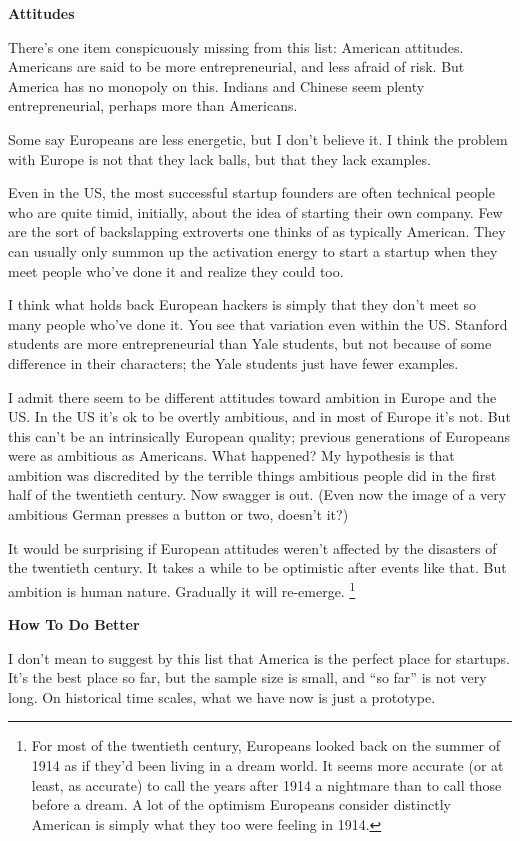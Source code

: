 \textbf{Attitudes}

There's one item conspicuously missing from this list: American
attitudes. Americans are said to be more entrepreneurial, and less
afraid of risk. But America has no monopoly on this. Indians and Chinese
seem plenty entrepreneurial, perhaps more than Americans.

Some say Europeans are less energetic, but I don't believe it. I think
the problem with Europe is not that they lack balls, but that they lack
examples.

Even in the US, the most successful startup founders are often technical
people who are quite timid, initially, about the idea of starting their
own company. Few are the sort of backslapping extroverts one thinks of
as typically American. They can usually only summon up the activation
energy to start a startup when they meet people who've done it and
realize they could too.

I think what holds back European hackers is simply that they don't meet
so many people who've done it. You see that variation even within the
US. Stanford students are more entrepreneurial than Yale students, but
not because of some difference in their characters; the Yale students
just have fewer examples.

I admit there seem to be different attitudes toward ambition in Europe
and the US. In the US it's ok to be overtly ambitious, and in most of
Europe it's not. But this can't be an intrinsically European quality;
previous generations of Europeans were as ambitious as Americans. What
happened? My hypothesis is that ambition was discredited by the terrible
things ambitious people did in the first half of the twentieth century.
Now swagger is out. (Even now the image of a very ambitious German
presses a button or two, doesn't it?)

It would be surprising if European attitudes weren't affected by the
disasters of the twentieth century. It takes a while to be optimistic
after events like that. But ambition is human nature. Gradually it will
re-emerge. \footnote{For most of the twentieth century, Europeans looked back on the
summer of 1914 as if they'd been living in a dream world. It seems more
accurate (or at least, as accurate) to call the years after 1914 a
nightmare than to call those before a dream. A lot of the optimism
Europeans consider distinctly American is simply what they too were
feeling in 1914.}

\textbf{How To Do Better}

I don't mean to suggest by this list that America is the perfect place
for startups. It's the best place so far, but the sample size is small,
and ``so far'' is not very long. On historical time scales, what we have
now is just a prototype.


